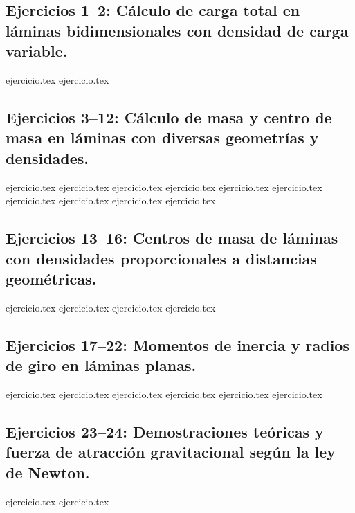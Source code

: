 
\subsection*{Ejercicios 1--2: Cálculo de carga total en láminas bidimensionales con densidad de carga variable.}
\begin{enumerate}
    {ejercicio.tex}
    {ejercicio.tex}
\end{enumerate}

\subsection*{Ejercicios 3--12: Cálculo de masa y centro de masa en láminas con diversas geometrías y densidades.}
\begin{enumerate}
    \setcounter{enumi}{2}
    {ejercicio.tex}
    {ejercicio.tex}
    {ejercicio.tex}
    {ejercicio.tex}
    {ejercicio.tex}
    {ejercicio.tex}
    {ejercicio.tex}
    {ejercicio.tex}
    {ejercicio.tex}
    {ejercicio.tex}
\end{enumerate}

\subsection*{Ejercicios 13--16: Centros de masa de láminas con densidades proporcionales a distancias geométricas.}
\begin{enumerate}
    \setcounter{enumi}{12}
    {ejercicio.tex}
    {ejercicio.tex}
    {ejercicio.tex}
    {ejercicio.tex}
\end{enumerate}

\subsection*{Ejercicios 17--22: Momentos de inercia y radios de giro en láminas planas.}
\begin{enumerate}
    \setcounter{enumi}{16}
    {ejercicio.tex}
    {ejercicio.tex}
    {ejercicio.tex}
    {ejercicio.tex}
    {ejercicio.tex}
    {ejercicio.tex}
\end{enumerate}

\subsection*{Ejercicios 23--24: Demostraciones teóricas y fuerza de atracción gravitacional según la ley de Newton.}
\begin{enumerate}
    \setcounter{enumi}{22}
    {ejercicio.tex}
    {ejercicio.tex}
\end{enumerate}
